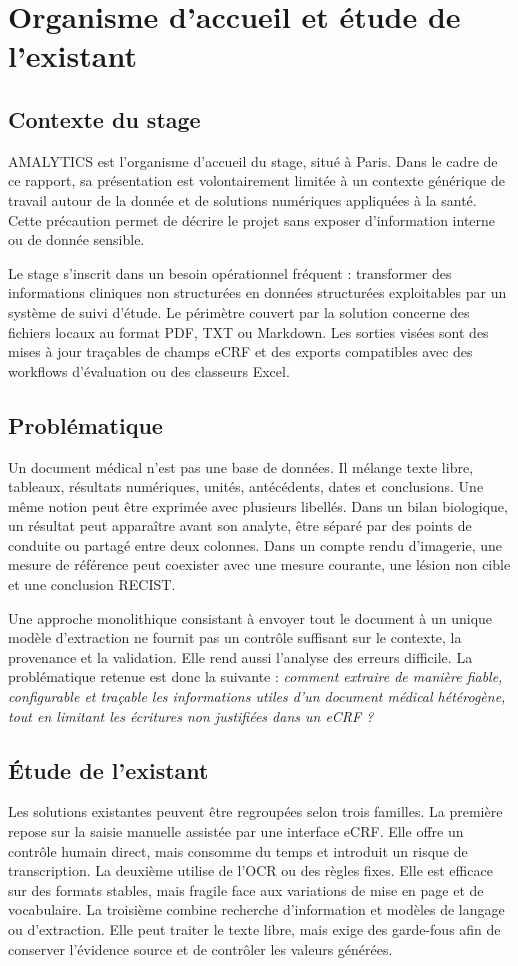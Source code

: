 \chapter{Organisme d'accueil et étude de l'existant}
\section{Contexte du stage}
AMALYTICS est l'organisme d'accueil du stage, situé à Paris. Dans le cadre de ce rapport, sa présentation est volontairement limitée à un contexte générique de travail autour de la donnée et de solutions numériques appliquées à la santé. Cette précaution permet de décrire le projet sans exposer d'information interne ou de donnée sensible.

Le stage s'inscrit dans un besoin opérationnel fréquent : transformer des informations cliniques non structurées en données structurées exploitables par un système de suivi d'étude. Le périmètre couvert par la solution concerne des fichiers locaux au format PDF, TXT ou Markdown. Les sorties visées sont des mises à jour traçables de champs eCRF et des exports compatibles avec des workflows d'évaluation ou des classeurs Excel.

\section{Problématique}
Un document médical n'est pas une base de données. Il mélange texte libre, tableaux, résultats numériques, unités, antécédents, dates et conclusions. Une même notion peut être exprimée avec plusieurs libellés. Dans un bilan biologique, un résultat peut apparaître avant son analyte, être séparé par des points de conduite ou partagé entre deux colonnes. Dans un compte rendu d'imagerie, une mesure de référence peut coexister avec une mesure courante, une lésion non cible et une conclusion RECIST.

Une approche monolithique consistant à envoyer tout le document à un unique modèle d'extraction ne fournit pas un contrôle suffisant sur le contexte, la provenance et la validation. Elle rend aussi l'analyse des erreurs difficile. La problématique retenue est donc la suivante : \emph{comment extraire de manière fiable, configurable et traçable les informations utiles d'un document médical hétérogène, tout en limitant les écritures non justifiées dans un eCRF ?}

\section{Étude de l'existant}
Les solutions existantes peuvent être regroupées selon trois familles. La première repose sur la saisie manuelle assistée par une interface eCRF. Elle offre un contrôle humain direct, mais consomme du temps et introduit un risque de transcription. La deuxième utilise de l'OCR ou des règles fixes. Elle est efficace sur des formats stables, mais fragile face aux variations de mise en page et de vocabulaire. La troisième combine recherche d'information et modèles de langage ou d'extraction. Elle peut traiter le texte libre, mais exige des garde-fous afin de conserver l'évidence source et de contrôler les valeurs générées.


